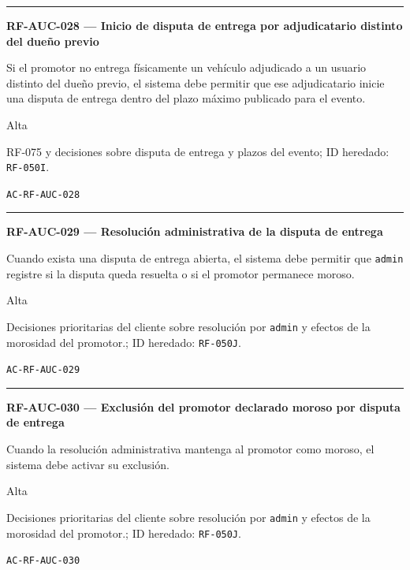 \documentclass[10pt,letterpaper]{article}
\begin{document}
\vspace{0.25em}\hrule\vspace{0.65em}
\noindent\textbf{RF-AUC-028 --- Inicio de disputa de entrega por adjudicatario distinto del dueño previo}\par
\begin{description}[style=nextline,leftmargin=3.15cm,labelwidth=2.8cm,font=\normalfont\bfseries]
\item[Obligación] Si el promotor no entrega físicamente un vehículo adjudicado a un usuario distinto del dueño previo, el sistema debe permitir que ese adjudicatario inicie una disputa de entrega dentro del plazo máximo publicado para el evento.
\item[Prioridad] Alta
\item[Procedencia] RF-075 y decisiones sobre disputa de entrega y plazos del evento; ID heredado: \texttt{RF-050I}.
\item[Verificación] \texttt{AC-RF-AUC-028}
\end{description}
\vspace{0.25em}\hrule\vspace{0.65em}
\noindent\textbf{RF-AUC-029 --- Resolución administrativa de la disputa de entrega}\par
\begin{description}[style=nextline,leftmargin=3.15cm,labelwidth=2.8cm,font=\normalfont\bfseries]
\item[Obligación] Cuando exista una disputa de entrega abierta, el sistema debe permitir que \texttt{admin} registre si la disputa queda resuelta o si el promotor permanece moroso.
\item[Prioridad] Alta
\item[Procedencia] Decisiones prioritarias del cliente sobre resolución por \texttt{admin} y efectos de la morosidad del promotor.; ID heredado: \texttt{RF-050J}.
\item[Verificación] \texttt{AC-RF-AUC-029}
\end{description}
\vspace{0.25em}\hrule\vspace{0.65em}
\noindent\textbf{RF-AUC-030 --- Exclusión del promotor declarado moroso por disputa de entrega}\par
\begin{description}[style=nextline,leftmargin=3.15cm,labelwidth=2.8cm,font=\normalfont\bfseries]
\item[Obligación] Cuando la resolución administrativa mantenga al promotor como moroso, el sistema debe activar su exclusión.
\item[Prioridad] Alta
\item[Procedencia] Decisiones prioritarias del cliente sobre resolución por \texttt{admin} y efectos de la morosidad del promotor.; ID heredado: \texttt{RF-050J}.
\item[Verificación] \texttt{AC-RF-AUC-030}
\end{description}
\end{document}
